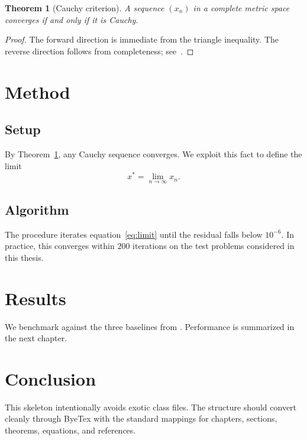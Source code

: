 \documentclass[12pt,a4paper]{report}
\newtheorem{theorem}{Theorem}[chapter]
\begin{document}
\begin{theorem}[Cauchy criterion]
\label{thm:cauchy}
A sequence $(x_n)$ in a complete metric space converges if and only if it is
Cauchy.
\end{theorem}

\begin{proof}
The forward direction is immediate from the triangle inequality. The reverse
direction follows from completeness; see~\cite{rudin1976}.
\end{proof}

\chapter{Method}

\section{Setup}

By Theorem~\ref{thm:cauchy}, any Cauchy sequence converges. We exploit this
fact to define the limit
\begin{equation}
x^* = \lim_{n \to \infty} x_n.
\label{eq:limit}
\end{equation}

\section{Algorithm}

The procedure iterates equation~\eqref{eq:limit} until the residual falls below
$10^{-6}$. In practice, this converges within $200$ iterations on the test
problems considered in this thesis.

\chapter{Results}

We benchmark against the three baselines from \cite{einstein,dirac,bohr}.
Performance is summarized in the next chapter.

\chapter{Conclusion}

This skeleton intentionally avoids exotic class files. The structure should
convert cleanly through ByeTex with the standard mappings for chapters,
sections, theorems, equations, and references.



\end{document}
